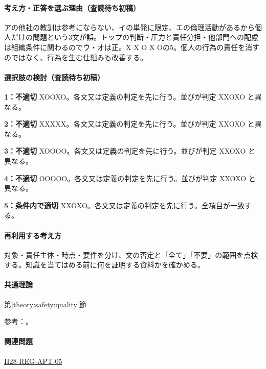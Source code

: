 \paragraph{考え方・正答を選ぶ理由（査読待ち初稿）} アの他社の教訓は参考にならない、イの単発に限定、エの倫理活動があるから個人だけの問題という3文が誤。トップの判断・圧力と責任分担・他部門への配慮は組織条件に関わるのでウ・オは正。X X O X Oの5。個人の行為の責任を消すのではなく、行為を生む仕組みも改善する。

\paragraph{選択肢の検討（査読待ち初稿）}\mbox{}\par

\noindent\textbf{1：不適切} XOOXO。各文又は定義の判定を先に行う。並びが判定 XXOXO と異なる。\par

\noindent\textbf{2：不適切} XXXXX。各文又は定義の判定を先に行う。並びが判定 XXOXO と異なる。\par

\noindent\textbf{3：不適切} XOOOO。各文又は定義の判定を先に行う。並びが判定 XXOXO と異なる。\par

\noindent\textbf{4：不適切} OOOOO。各文又は定義の判定を先に行う。並びが判定 XXOXO と異なる。\par

\noindent\textbf{5：条件内で適切} XXOXO。各文又は定義の判定を先に行う。全項目が一致する。\par

\paragraph{再利用する考え方} 対象・責任主体・時点・要件を分け、文の否定と「全て」「不要」の範囲を点検する。知識を当てはめる前に何を証明する資料かを確かめる。

\paragraph{共通理論} \hyperref[theory:safety:quality]{第\ref*{theory:safety:quality}節}

\par 参考：\cite{saf53_quality2020,saf53_pile2015}。

\paragraph{関連問題} \hyperref[q:h28-reg-apt-05]{H28-REG-APT-05}

